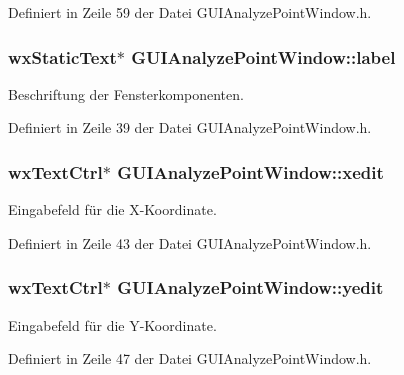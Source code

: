 Definiert in Zeile 59 der Datei G\-U\-I\-Analyze\-Point\-Window.\-h.

\hypertarget{classGUIAnalyzePointWindow_ae3f474800a7f7d9e4a897bdf33510f01}{
\subsubsection[{label}]{\setlength{\rightskip}{0pt plus 5cm}wx\-Static\-Text$\ast$ G\-U\-I\-Analyze\-Point\-Window\-::label\hspace{0.3cm}{\ttfamily [private]}}}\label{classGUIAnalyzePointWindow_ae3f474800a7f7d9e4a897bdf33510f01}
Beschriftung der Fensterkomponenten. 

Definiert in Zeile 39 der Datei G\-U\-I\-Analyze\-Point\-Window.\-h.

\hypertarget{classGUIAnalyzePointWindow_a4c3d50b2c5c38b8b757cdb1c04ea83b6}{
\subsubsection[{xedit}]{\setlength{\rightskip}{0pt plus 5cm}wx\-Text\-Ctrl$\ast$ G\-U\-I\-Analyze\-Point\-Window\-::xedit\hspace{0.3cm}{\ttfamily [private]}}}\label{classGUIAnalyzePointWindow_a4c3d50b2c5c38b8b757cdb1c04ea83b6}
Eingabefeld für die X-\/\-Koordinate. 

Definiert in Zeile 43 der Datei G\-U\-I\-Analyze\-Point\-Window.\-h.

\hypertarget{classGUIAnalyzePointWindow_ac4352df05ac2a001551801a90fc8bc42}{
\subsubsection[{yedit}]{\setlength{\rightskip}{0pt plus 5cm}wx\-Text\-Ctrl$\ast$ G\-U\-I\-Analyze\-Point\-Window\-::yedit\hspace{0.3cm}{\ttfamily [private]}}}\label{classGUIAnalyzePointWindow_ac4352df05ac2a001551801a90fc8bc42}
Eingabefeld für die Y-\/\-Koordinate. 

Definiert in Zeile 47 der Datei G\-U\-I\-Analyze\-Point\-Window.\-h.

